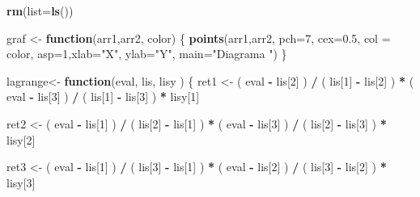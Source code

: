 \documentclass[]{article}
\newenvironment{Shaded}{\begin{snugshade}}{\end{snugshade}}
\newcommand{\KeywordTok}[1]{\textcolor[rgb]{0.13,0.29,0.53}{\textbf{#1}}}
\newcommand{\DataTypeTok}[1]{\textcolor[rgb]{0.13,0.29,0.53}{#1}}
\newcommand{\DecValTok}[1]{\textcolor[rgb]{0.00,0.00,0.81}{#1}}
\newcommand{\FloatTok}[1]{\textcolor[rgb]{0.00,0.00,0.81}{#1}}
\newcommand{\StringTok}[1]{\textcolor[rgb]{0.31,0.60,0.02}{#1}}
\newcommand{\ControlFlowTok}[1]{\textcolor[rgb]{0.13,0.29,0.53}{\textbf{#1}}}
\newcommand{\OperatorTok}[1]{\textcolor[rgb]{0.81,0.36,0.00}{\textbf{#1}}}
\newcommand{\NormalTok}[1]{#1}
\begin{document}
\begin{Shaded}
\begin{Highlighting}[]
\KeywordTok{rm}\NormalTok{(}\DataTypeTok{list=}\KeywordTok{ls}\NormalTok{())}

\NormalTok{graf <-}\StringTok{ }\ControlFlowTok{function}\NormalTok{(arr1,arr2, color)}
\NormalTok{\{}
  \KeywordTok{points}\NormalTok{(arr1,arr2, }\DataTypeTok{pch=}\DecValTok{7}\NormalTok{, }\DataTypeTok{cex=}\FloatTok{0.5}\NormalTok{, }\DataTypeTok{col =}\NormalTok{ color, }\DataTypeTok{asp=}\DecValTok{1}\NormalTok{,}\DataTypeTok{xlab=}\StringTok{"X"}\NormalTok{, }\DataTypeTok{ylab=}\StringTok{"Y"}\NormalTok{, }\DataTypeTok{main=}\StringTok{"Diagrama "}\NormalTok{)}
\NormalTok{\}}

\NormalTok{lagrange<-}\StringTok{ }\ControlFlowTok{function}\NormalTok{(eval, lis, lisy )}
\NormalTok{\{}
\NormalTok{  ret1 <-}\StringTok{ }\NormalTok{( eval }\OperatorTok{-}\StringTok{ }\NormalTok{lis[}\DecValTok{2}\NormalTok{] ) }\OperatorTok{/}\StringTok{ }\NormalTok{( lis[}\DecValTok{1}\NormalTok{] }\OperatorTok{-}\StringTok{ }\NormalTok{lis[}\DecValTok{2}\NormalTok{] ) }\OperatorTok{*}\StringTok{ }\NormalTok{( eval }\OperatorTok{-}\StringTok{ }\NormalTok{lis[}\DecValTok{3}\NormalTok{] ) }\OperatorTok{/}\StringTok{ }\NormalTok{( lis[}\DecValTok{1}\NormalTok{] }\OperatorTok{-}\StringTok{ }\NormalTok{lis[}\DecValTok{3}\NormalTok{] ) }\OperatorTok{*}\StringTok{ }\NormalTok{lisy[}\DecValTok{1}\NormalTok{]}
  
\NormalTok{  ret2 <-}\StringTok{ }\NormalTok{( eval }\OperatorTok{-}\StringTok{ }\NormalTok{lis[}\DecValTok{1}\NormalTok{] ) }\OperatorTok{/}\StringTok{ }\NormalTok{( lis[}\DecValTok{2}\NormalTok{] }\OperatorTok{-}\StringTok{ }\NormalTok{lis[}\DecValTok{1}\NormalTok{] ) }\OperatorTok{*}\StringTok{ }\NormalTok{( eval }\OperatorTok{-}\StringTok{ }\NormalTok{lis[}\DecValTok{3}\NormalTok{] ) }\OperatorTok{/}\StringTok{ }\NormalTok{( lis[}\DecValTok{2}\NormalTok{] }\OperatorTok{-}\StringTok{ }\NormalTok{lis[}\DecValTok{3}\NormalTok{] ) }\OperatorTok{*}\StringTok{ }\NormalTok{lisy[}\DecValTok{2}\NormalTok{]}
  
\NormalTok{  ret3 <-}\StringTok{ }\NormalTok{( eval }\OperatorTok{-}\StringTok{ }\NormalTok{lis[}\DecValTok{1}\NormalTok{] ) }\OperatorTok{/}\StringTok{ }\NormalTok{( lis[}\DecValTok{3}\NormalTok{] }\OperatorTok{-}\StringTok{ }\NormalTok{lis[}\DecValTok{1}\NormalTok{] ) }\OperatorTok{*}\StringTok{ }\NormalTok{( eval }\OperatorTok{-}\StringTok{ }\NormalTok{lis[}\DecValTok{2}\NormalTok{] ) }\OperatorTok{/}\StringTok{ }\NormalTok{( lis[}\DecValTok{3}\NormalTok{] }\OperatorTok{-}\StringTok{ }\NormalTok{lis[}\DecValTok{2}\NormalTok{] ) }\OperatorTok{*}\StringTok{ }\NormalTok{lisy[}\DecValTok{3}\NormalTok{]}
  

\end{Highlighting}
\end{Shaded}
\end{document}
